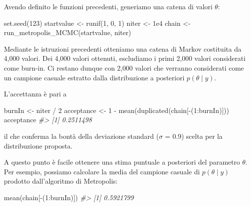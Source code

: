 \documentclass[
]{memoir}
\newenvironment{Shaded}{\begin{snugshade}}{\end{snugshade}}
\newcommand{\CommentTok}[1]{\textcolor[rgb]{0.56,0.35,0.01}{\textit{#1}}}
\newcommand{\DecValTok}[1]{\textcolor[rgb]{0.00,0.00,0.81}{#1}}
\newcommand{\FloatTok}[1]{\textcolor[rgb]{0.00,0.00,0.81}{#1}}
\newcommand{\FunctionTok}[1]{\textcolor[rgb]{0.00,0.00,0.00}{#1}}
\newcommand{\NormalTok}[1]{#1}
\newcommand{\OtherTok}[1]{\textcolor[rgb]{0.56,0.35,0.01}{#1}}
\newcommand{\SpecialCharTok}[1]{\textcolor[rgb]{0.00,0.00,0.00}{#1}}
\begin{document}
Avendo definito le funzioni precedenti, generiamo una catena di valori \(\theta\):

\begin{Shaded}
\begin{Highlighting}[]
\FunctionTok{set.seed}\NormalTok{(}\DecValTok{123}\NormalTok{)}
\NormalTok{startvalue }\OtherTok{\textless{}{-}} \FunctionTok{runif}\NormalTok{(}\DecValTok{1}\NormalTok{, }\DecValTok{0}\NormalTok{, }\DecValTok{1}\NormalTok{)}
\NormalTok{niter }\OtherTok{\textless{}{-}} \FloatTok{1e4}
\NormalTok{chain }\OtherTok{\textless{}{-}} \FunctionTok{run\_metropolis\_MCMC}\NormalTok{(startvalue, niter)}
\end{Highlighting}
\end{Shaded}

Mediante le istruzioni precedenti otteniamo una catena di Markov costituita da 4,000 valori. Dei 4,000 valori ottenuti, escludiamo i primi 2,000 valori considerati come burn-in. Ci restano dunque con 2,000 valori che verranno considerati come un campione casuale estratto dalla distribuzione a posteriori \(p(\theta \mid y)\).

L'accettanza è pari a

\begin{Shaded}
\begin{Highlighting}[]
\NormalTok{burnIn }\OtherTok{\textless{}{-}}\NormalTok{ niter }\SpecialCharTok{/} \DecValTok{2}
\NormalTok{acceptance }\OtherTok{\textless{}{-}} \DecValTok{1} \SpecialCharTok{{-}} \FunctionTok{mean}\NormalTok{(}\FunctionTok{duplicated}\NormalTok{(chain[}\SpecialCharTok{{-}}\NormalTok{(}\DecValTok{1}\SpecialCharTok{:}\NormalTok{burnIn)]))}
\NormalTok{acceptance}
\CommentTok{\#\textgreater{} [1] 0.2511498}
\end{Highlighting}
\end{Shaded}

il che conferma la bontà della deviazione standard (\(\sigma\) = 0.9) scelta per la distribuzione proposta.

A questo punto è facile ottenere una stima puntuale a posteriori del parametro \(\theta\). Per esempio, possiamo calcolare la media del campione casuale di \(p(\theta \mid y)\) prodotto dall'algoritmo di Metropolis:

\begin{Shaded}
\begin{Highlighting}[]
\FunctionTok{mean}\NormalTok{(chain[}\SpecialCharTok{{-}}\NormalTok{(}\DecValTok{1}\SpecialCharTok{:}\NormalTok{burnIn)])}
\CommentTok{\#\textgreater{} [1] 0.5921799}
\end{Highlighting}
\end{Shaded}
\end{document}
